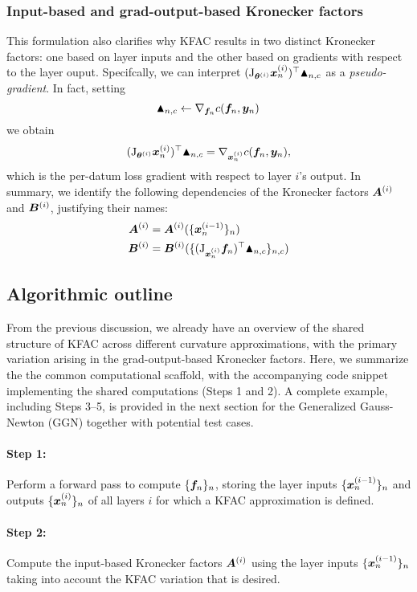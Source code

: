 \subsubsection{Input-based and grad-output-based Kronecker factors}
This formulation also clarifies why KFAC results in two distinct Kronecker factors: one based on layer inputs and the other based on gradients with respect to the layer ouput. Specifcally, we can interpret $(\mathrm{J}_{{\bm{\theta}}^{(i)}} {\bm{x}}_n^{(i)})^{\top} \blacktriangle_{n,c}$ as a \emph{pseudo-gradient}. In fact, setting 
$$\blacktriangle_{n,c} \leftarrow \nabla_{{\bm{f}}_n} c({\bm{f}}_n, {\bm{y}}_n)\,$$
we obtain 
$$(\mathrm{J}_{{\bm{\theta}}^{(i)}} {\bm{x}}_n^{(i)})^{\top} \blacktriangle_{n,c} = \nabla_{{\bm{x}}_n^{(i)}} c({\bm{f}}_n, {\bm{y}}_n),$$
which is the per-datum loss gradient with respect to layer $i$'s output.
In summary, we identify the following dependencies of the Kronecker factors ${\bm{A}}^{(i)}$ and ${\bm{B}}^{(i)}$, justifying their names:
\begin{align*}
  {\bm{A}}^{(i)} &= {\bm{A}}^{(i)}( \{{\bm{x}}_{n}^{(i-1)}\}_n )
  \\
  {\bm{B}}^{(i)} &= {\bm{B}}^{(i)}( \{ (\mathrm{J}_{{\bm{x}}_n^{(i)}}{\bm{f}}_{n})^{\top} \blacktriangle_{n,c}\}_{n,c})
\end{align*}

\subsection{Algorithmic outline}

From the previous discussion, we already have an overview of the shared structure of KFAC across different curvature approximations, with the primary variation arising in the grad-output-based Kronecker factors. 
Here, we summarize the the common computational scaffold, with the accompanying code snippet implementing the shared computations (Steps 1 and 2). 
A complete example, including Steps 3–5, is provided in the next section for the Generalized Gauss-Newton (GGN) together with potential test cases.

\paragraph{Step 1:} Perform a forward pass to compute $\{{\bm{f}}_n\}_n $, storing the layer inputs $\{{\bm{x}}_n^{(i-1)} \}_n$ and outputs $\{{\bm{x}}_n^{(i)}\}_n$ of all layers $i$ for which a KFAC approximation is defined.

\paragraph{Step 2:} Compute the input-based Kronecker factors ${\bm{A}}^{(i)}$ using the layer inputs $\{{\bm{x}}_n^{(i-1)}\}_n$ taking into account the KFAC variation that is desired.


